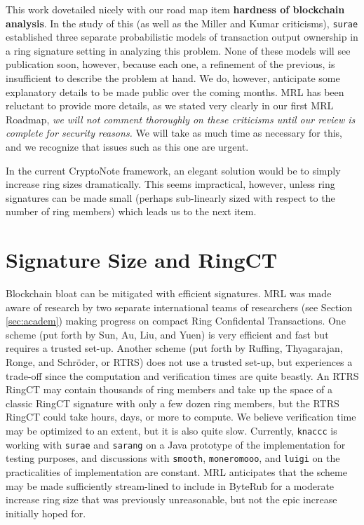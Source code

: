 \documentclass[12pt,english]{mrl}
\theoremstyle{definition}
\numberwithin{equation}{section}
\numberwithin{figure}{section}
\numberwithin{equation}{section}
\numberwithin{equation}{section}
\numberwithin{figure}{section}
\begin{document}
This work dovetailed nicely with our road map item \textbf{hardness of blockchain analysis}.  In the study of this (as well as the Miller and Kumar criticisms), \texttt{surae} established three separate probabilistic models of transaction output ownership in a ring signature setting in analyzing this problem. None of these models will see publication soon, however, because each one, a refinement of the previous, is insufficient to describe the problem at hand. We do, however, anticipate some explanatory details to be made public over the coming months. MRL has been reluctant to provide more details, as we stated very clearly in our first MRL Roadmap, \emph{we will not comment thoroughly on these criticisms until our review is complete for security reasons.} We will take as much time as necessary for this, and we recognize that issues such as this one are urgent.
    
In the current CryptoNote framework, an elegant solution would be to simply increase ring sizes dramatically. This seems impractical, however, unless ring signatures can be made small (perhaps sub-linearly sized with respect to the number of ring members) which leads us to the next item.
    
\section{Signature Size and RingCT}

Blockchain bloat can be mitigated with efficient signatures. MRL was made aware of research by two separate international teams of researchers (see Section \ref{sec:academ}) making progress on compact Ring Confidental Transactions. One scheme (put forth by Sun, Au, Liu, and Yuen) is very efficient and fast but requires a trusted set-up. Another scheme (put forth by Ruffing,  Thyagarajan, Ronge, and Schr{\"o}der, or RTRS) does not use a trusted set-up, but experiences a trade-off since the computation and verification times are quite beastly. An RTRS RingCT may contain thousands of ring members and take up the space of a classic RingCT signature with only a few dozen ring members, but the RTRS RingCT could take hours, days, or more to compute. We believe verification time may be optimized to an extent, but it is also quite slow. Currently, \texttt{knaccc} is working with \texttt{surae} and \texttt{sarang} on a Java prototype of the implementation for testing purposes, and discussions with \texttt{smooth}, \texttt{moneromooo}, and \texttt{luigi} on the practicalities of implementation are constant. MRL anticipates that the scheme may be made sufficiently stream-lined to include in ByteRub for a moderate increase ring size that was previously unreasonable, but not the epic increase initially hoped for.
    
\end{document}
